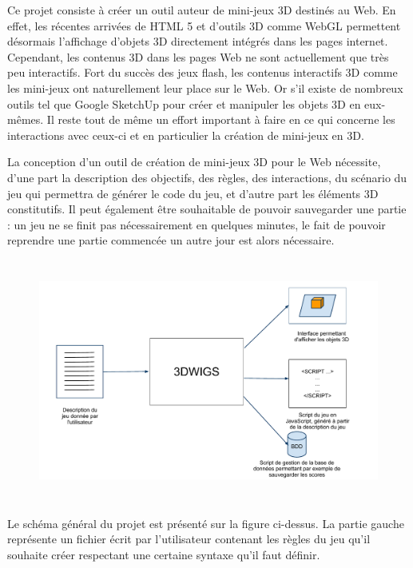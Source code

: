 Ce projet consiste à créer un outil auteur de mini-jeux 3D destinés au Web.
En effet, les récentes arrivées de HTML 5 et d'outils 3D comme WebGL permettent désormais l'affichage d'objets 3D directement
intégrés dans les pages internet.
Cependant, les contenus 3D dans les pages Web ne sont actuellement que très peu interactifs.
Fort du succès des jeux flash, les contenus interactifs 3D comme les mini-jeux ont naturellement leur place sur le Web.
Or s'il existe de nombreux outils tel que Google SketchUp pour créer et manipuler les objets 3D en eux-mêmes.
Il reste tout de même un effort important à faire en ce qui concerne les interactions avec ceux-ci et en particulier la création de mini-jeux en 3D.

\vspace{0.5cm}

La conception d'un outil de création de mini-jeux 3D pour le Web nécessite, d'une part la description des objectifs, des règles, des interactions, 
du scénario du jeu qui permettra de générer le code du jeu, et d'autre part les éléments 3D constitutifs.
Il peut également être souhaitable de pouvoir sauvegarder une partie :
un jeu ne se finit pas nécessairement en quelques minutes, le fait de pouvoir reprendre une partie commencée un autre jour est alors nécessaire.

\begin{figure}[h]
 \centering
 \includegraphics[height=8cm]{img/schema_general}
 \label{fig:schemaprojet}
\end{figure}

Le schéma général du projet est présenté sur la figure ci-dessus.
La partie gauche représente un fichier écrit par l'utilisateur contenant les règles du jeu qu'il souhaite créer respectant
une certaine syntaxe qu'il faut définir.

